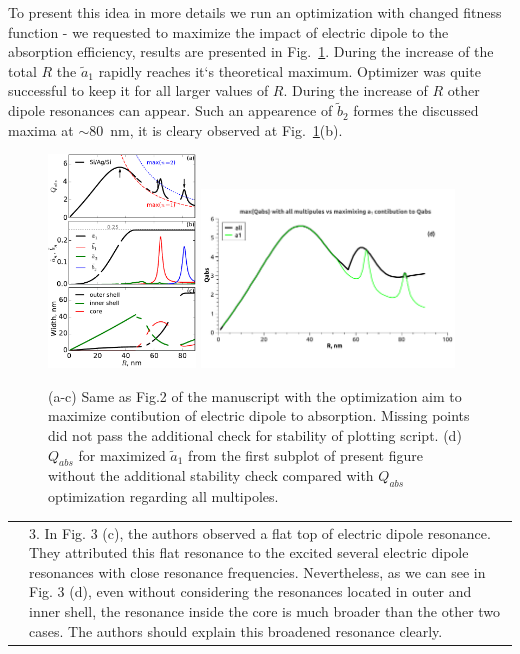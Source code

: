 \documentclass[a4paper]{article}
\begin{document}
To present this idea in more details we run an optimization with
changed fitness function - we requested to maximize the impact of
electric dipole to the absorption efficiency, results are presented in
Fig.~\ref{fig:a1max}. During the increase of the total $R$ the
$\tilde{a}_1$ rapidly reaches it`s theoretical maximum. Optimizer was
quite successful to keep it for all larger values of $R$. During the
increase of $R$ other dipole resonances can appear. Such an appearence
of $\tilde{b}_2$ formes the discussed maxima at $\sim 80$~nm, it is
cleary observed at Fig.~\ref{fig:a1max}(b).
\begin{figure}
  \includegraphics[width=0.35\textwidth]{overview-Qabs-a1}
   \includegraphics[width=0.60\textwidth]{overview-Qabs-all-a1}
  \caption{(a-c) Same as Fig.2 of the manuscript with the optimization
    aim to maximize contibution of electric dipole to
    absorption. Missing points did not pass the additional check for
    stability of plotting script. (d) $Q_{abs}$ for maximized
    $\tilde{a}_1$ from the first subplot of present figure without the
    additional stability check compared with $Q_{abs}$ optimization
    regarding all multipoles.\label{fig:a1max}}
\end{figure}


\begin{tabular}[!H]{l|p{}}
\quad & 3.      In Fig. 3 (c), the authors observed a flat top of
electric dipole resonance. They attributed this flat resonance to the
excited several electric dipole resonances with close resonance
frequencies. Nevertheless, as we can see in Fig. 3 (d), even without
considering the resonances located in outer and inner shell, the
resonance inside the core is much broader than the other two
cases. The authors should explain this broadened resonance clearly. 
\end{tabular}
\end{document}
